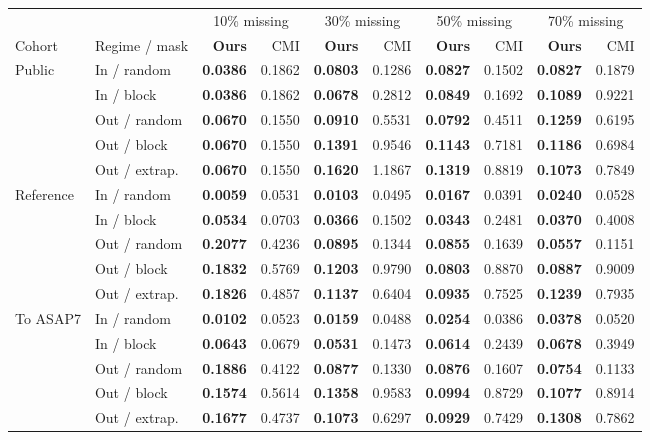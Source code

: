 \scriptsize
\setlength{\tabcolsep}{2.6pt}
\begin{tabular*}{\linewidth}{@{\extracolsep{\fill}}llrrrrrrrr@{}}\toprule
 &  & \multicolumn{2}{c}{10\% missing} & \multicolumn{2}{c}{30\% missing} & \multicolumn{2}{c}{50\% missing} & \multicolumn{2}{c}{70\% missing} \\
\cmidrule(lr){3-4}\cmidrule(lr){5-6}\cmidrule(lr){7-8}\cmidrule(lr){9-10}
Cohort & Regime / mask & \textbf{Ours} & CMI & \textbf{Ours} & CMI & \textbf{Ours} & CMI & \textbf{Ours} & CMI \\
\midrule
Public & In / random & \textbf{0.0386} & 0.1862 & \textbf{0.0803} & 0.1286 & \textbf{0.0827} & 0.1502 & \textbf{0.0827} & 0.1879 \\
 & In / block & \textbf{0.0386} & 0.1862 & \textbf{0.0678} & 0.2812 & \textbf{0.0849} & 0.1692 & \textbf{0.1089} & 0.9221 \\
 & Out / random & \textbf{0.0670} & 0.1550 & \textbf{0.0910} & 0.5531 & \textbf{0.0792} & 0.4511 & \textbf{0.1259} & 0.6195 \\
 & Out / block & \textbf{0.0670} & 0.1550 & \textbf{0.1391} & 0.9546 & \textbf{0.1143} & 0.7181 & \textbf{0.1186} & 0.6984 \\
 & Out / extrap. & \textbf{0.0670} & 0.1550 & \textbf{0.1620} & 1.1867 & \textbf{0.1319} & 0.8819 & \textbf{0.1073} & 0.7849 \\
\midrule
Reference & In / random & \textbf{0.0059} & 0.0531 & \textbf{0.0103} & 0.0495 & \textbf{0.0167} & 0.0391 & \textbf{0.0240} & 0.0528 \\
 & In / block & \textbf{0.0534} & 0.0703 & \textbf{0.0366} & 0.1502 & \textbf{0.0343} & 0.2481 & \textbf{0.0370} & 0.4008 \\
 & Out / random & \textbf{0.2077} & 0.4236 & \textbf{0.0895} & 0.1344 & \textbf{0.0855} & 0.1639 & \textbf{0.0557} & 0.1151 \\
 & Out / block & \textbf{0.1832} & 0.5769 & \textbf{0.1203} & 0.9790 & \textbf{0.0803} & 0.8870 & \textbf{0.0887} & 0.9009 \\
 & Out / extrap. & \textbf{0.1826} & 0.4857 & \textbf{0.1137} & 0.6404 & \textbf{0.0935} & 0.7525 & \textbf{0.1239} & 0.7935 \\
\midrule
To ASAP7 & In / random & \textbf{0.0102} & 0.0523 & \textbf{0.0159} & 0.0488 & \textbf{0.0254} & 0.0386 & \textbf{0.0378} & 0.0520 \\
 & In / block & \textbf{0.0643} & 0.0679 & \textbf{0.0531} & 0.1473 & \textbf{0.0614} & 0.2439 & \textbf{0.0678} & 0.3949 \\
 & Out / random & \textbf{0.1886} & 0.4122 & \textbf{0.0877} & 0.1330 & \textbf{0.0876} & 0.1607 & \textbf{0.0754} & 0.1133 \\
 & Out / block & \textbf{0.1574} & 0.5614 & \textbf{0.1358} & 0.9583 & \textbf{0.0994} & 0.8729 & \textbf{0.1077} & 0.8914 \\
 & Out / extrap. & \textbf{0.1677} & 0.4737 & \textbf{0.1073} & 0.6297 & \textbf{0.0929} & 0.7429 & \textbf{0.1308} & 0.7862 \\
\bottomrule\end{tabular*}
